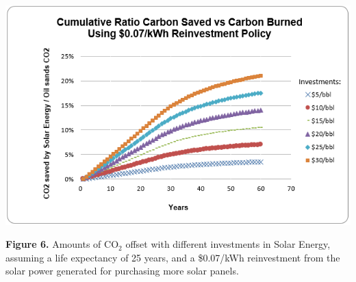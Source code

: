 \documentclass[11pt]{article}
\begin{document}
\begin{center}
\includegraphics{g6.png}
\end{center}

\begin{center}
{\bf Figure 6.} Amounts of CO$_2$ offset with different investments in Solar Energy, assuming a life expectancy of 25 years, and a \$0.07/kWh reinvestment from the solar power generated for purchasing more solar panels.  
\end{center}
\end{document}

